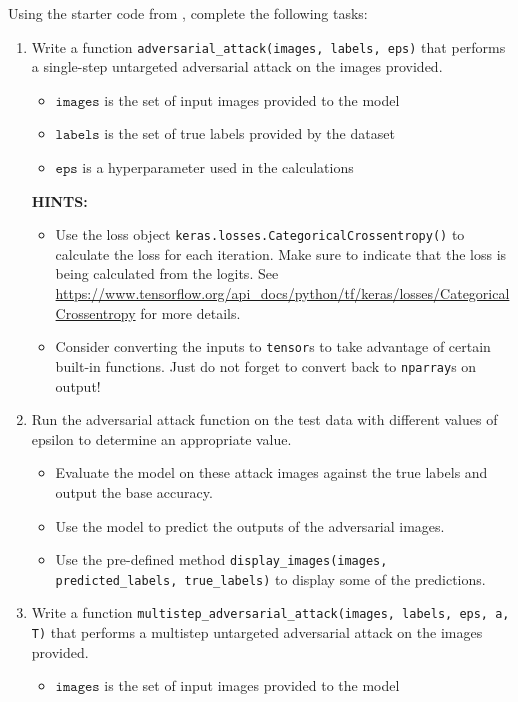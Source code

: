 \documentclass{article}
\begin{document}
Using the starter code from , complete the following tasks:
\begin{enumerate}
    \item Write a function \texttt{adversarial\_attack(images, labels, eps)} that performs a single-step untargeted adversarial attack on the images provided.
    \begin{itemize}
        \item $\texttt{images}$ is the set of input images provided to the model
        \item $\texttt{labels}$ is the set of true labels provided by the dataset
        \item $\texttt{eps}$ is a hyperparameter used in the calculations
    \end{itemize}
    \textbf{HINTS:}
    \begin{itemize}
        \item Use the loss object \texttt{keras.losses.CategoricalCrossentropy()} to calculate the loss for each iteration. Make sure to indicate that the loss is being calculated from the logits. See \url{https://www.tensorflow.org/api_docs/python/tf/keras/losses/CategoricalCrossentropy} for more details.
        \item Consider converting the inputs to \texttt{tensor}s to take advantage of certain built-in functions. Just do not forget to convert back to \texttt{nparray}s on output!
    \end{itemize}
    \item Run the adversarial attack function on the test data with different values of epsilon to determine an appropriate value.
    \begin{itemize}
        \item Evaluate the model on these attack images against the true labels and output the base accuracy. 
        \item Use the model to predict the outputs of the adversarial images.
        \item Use the pre-defined method \texttt{display\_images(images, predicted\_labels, true\_labels)} to display some of the predictions.
    \end{itemize}
    \item Write a function \texttt{multistep\_adversarial\_attack(images, labels, eps, a, T)} that performs a multistep untargeted adversarial attack on the images provided.
    \begin{itemize}
        \item $\texttt{images}$ is the set of input images provided to the model

\end{itemize}
\end{enumerate}
\end{document}
